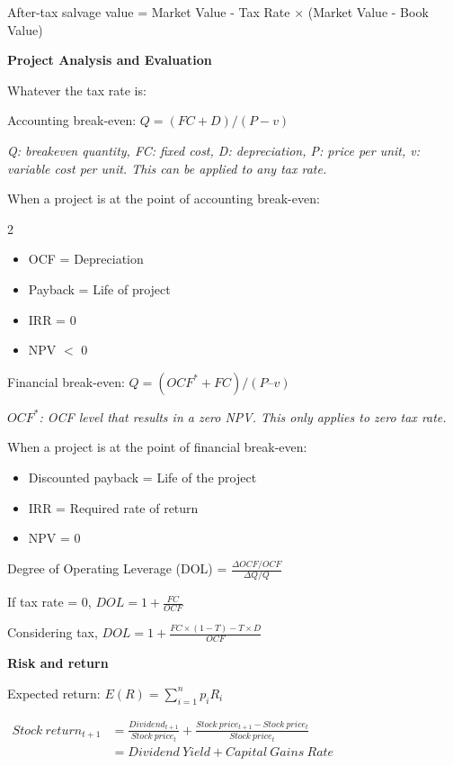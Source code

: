 \documentclass{article}
\newcommand{\bigtitle}[1]{
	\noindent
	\textbf{#1}
}
\begin{document}
\vspace{-1em}

After-tax salvage value = Market Value - Tax Rate $\times$ (Market Value - Book Value)

\bigtitle{Project Analysis and Evaluation}

Whatever the tax rate is:

Accounting break-even: $ Q = (FC + D)/(P-v) $

\noindent
\textit{Q: breakeven quantity, FC: fixed cost, D: depreciation, P: price per unit, v: variable cost per unit. This can be applied to any tax rate.}

When a project is at the point of accounting break-even:

\vspace{-2.85ex}
\begin{multicols}{2}
\begin{itemize}
	\item OCF = Depreciation
	\item Payback = Life of project
	\item IRR = 0
	\item NPV $<$ 0
\end{itemize}
\end{multicols}
\vspace{-2.85ex}

Financial break-even: $Q = (OCF^*+ FC)/(P – v)$

\textit{$ OCF^* $: OCF level that results in a zero NPV. This only applies to zero tax rate.}

When a project is at the point of financial break-even:

\begin{itemize}
	\item Discounted payback = Life of the project
	\item IRR = Required rate of return
	\item NPV = 0
\end{itemize}

Degree of Operating Leverage (DOL) = $\frac{\Delta OCF/OCF}{\Delta Q/Q}$

If tax rate = 0, $DOL = 1+\frac{FC}{OCF}$

Considering tax, $DOL = 1+\frac{FC\times(1-T)-T\times D}{OCF}$

\bigtitle{Risk and return}

Expected return: $E(R) = \sum \limits_{i=1}^{n}p_iR_i$

\noindent
$
\begin{aligned}
	Stock\ return_{t+1}  &= \frac{Dividend_{t+1}}{Stock\ price_t} + \frac{Stock\ price_{t+1}-Stock\ price_{t}}{Stock\ price_t}\\
	&= Dividend\ Yield + Capital\ Gains\ Rate
\end{aligned}
$
\end{document}
